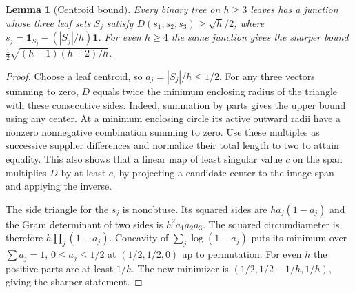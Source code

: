 \documentclass[11pt]{article}
\newtheorem{lemma}[theorem]{Lemma}
\theoremstyle{remark}
\begin{document}
\begin{lemma}[Centroid bound]\label{centroid}
Every binary tree on $h\ge3$ leaves has a junction whose three leaf sets $S_j$ satisfy $D(s_1,s_2,s_3)\ge\sqrt h/2$, where $s_j=\mathbf1_{S_j}-(|S_j|/h)\mathbf1$. For even $h\ge4$ the same junction gives the sharper bound $\tfrac12\sqrt{(h-1)(h+2)/h}$.
\end{lemma}
\begin{proof}
Choose a leaf centroid, so $a_j=|S_j|/h\le1/2$. For any three vectors summing to zero, $D$ equals twice the minimum enclosing radius of the triangle with these consecutive sides. Indeed, summation by parts gives the upper bound using any center. At a minimum enclosing circle its active outward radii have a nonzero nonnegative combination summing to zero. Use these multiples as successive supplier differences and normalize their total length to two to attain equality. This also shows that a linear map of least singular value $c$ on the span multiplies $D$ by at least $c$, by projecting a candidate center to the image span and applying the inverse.

The side triangle for the $s_j$ is nonobtuse. Its squared sides are $h a_j(1-a_j)$ and the Gram determinant of two sides is $h^2a_1a_2a_3$. The squared circumdiameter is therefore $h\prod_j(1-a_j)$. Concavity of $\sum_j\log(1-a_j)$ puts its minimum over $\sum a_j=1$, $0\le a_j\le1/2$ at $(1/2,1/2,0)$ up to permutation. For even $h$ the positive parts are at least $1/h$. The new minimizer is $(1/2,1/2-1/h,1/h)$, giving the sharper statement.
\end{proof}
\end{document}
